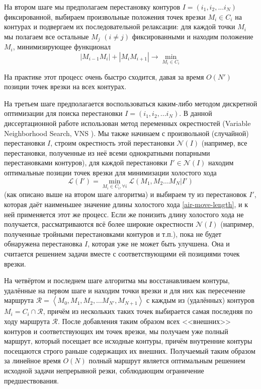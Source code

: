 На втором шаге мы предполагаем перестановку контуров
$I = (i_1, i_2, ... i_N)$
фиксированной,
выбираем произвольные положения точек врезки
$M_i \in C_i$ на контурах и подвергаем их последовательной релаксации:
для каждой точки $M_i$
мы полагаем все остальные $M_j$ $(i\ne j)$ фиксированными и находим
положение $M_i$, минимизирующее функционал
$$
|M_{i-1}M_i|+|M_iM_{i+1}| \to \min_{M_i \in C_i}
$$

На практике этот процесс очень быстро сходится,
давая за время $O(N')$
позиции точек врезки на всех контурах.

На третьем шаге предполагается воспользоваться каким-либо
методом дискретной оптимизации для поиска перестановки
$I = (i_1, i_2, ... i_N)$.
В данной диссертационной работе использован метод
переменных окрестностей
(Variable Neighborhood Search,
VNS
\autocite{bi:VNS}).
Мы также начинаем с произвольной
(случайной) перестановки $I$,
строим окрестность этой перестановки
$\mathcal N(I)$
(например, все перестановки,
полученные из неё всеми однократными попарными перестановками контуров),
для каждой перестановки $I'\in \mathcal N(I)$
находим оптимальные позиции точек врезки
для минимизации холостого хода
$$
\mathcal L (I') = \min_{M_i\in C_i, \forall i}
  \mathcal L (M_1, M_2 \dots M_N | I')
$$
(как описано выше на втором шаге алгоритма)
и выбираем ту из перестановок $I'$,
которая даёт наименьшее значение длины
холостого хода \eqref{air-move-length},
и к ней применяется этот же процесс.
Если же понизить длину холостого хода не получается,
рассматриваются всё более широкие окрестности
$\mathcal N(I)$
(например, полученные тройными перестановками контуров
и т.п.),
пока не будет обнаружена перестановка $I$,
которая уже не может быть улучшена.
Она и считается решением задачи
вместе с соответствующими ей позициями точек врезки.

На четвёртом и последнем шаге алгоритма
мы восстанавливаем контуры,
удалённые на первом шаге и находим точки
врезки и для них как пересечение маршрута
$
\mathcal R = \left< M_0, M_1, M_2, \dots M_{N'}, M_{N+1}\right>
$
с каждым из (удалённых) контуров
$M_i = C_i \cap \mathcal R$,
причём из нескольких таких точек
выбирается самая последняя по ходу маршрута
$\mathcal R$.
После добавления таким образом всех
<<внешних>> контуров
и соответствующих им точек врезки,
мы получаем уже полный маршрут,
который посещает все исходные контуры,
причём внутренние контуры посещаются
строго раньше содержащих их внешних.
Получаемый таким образом
за линейное время
$O(N)$
полный маршрут
является оптимальным решением исходной задачи
непрерывной резки,
соблюдающим
ограничение предшествования.

